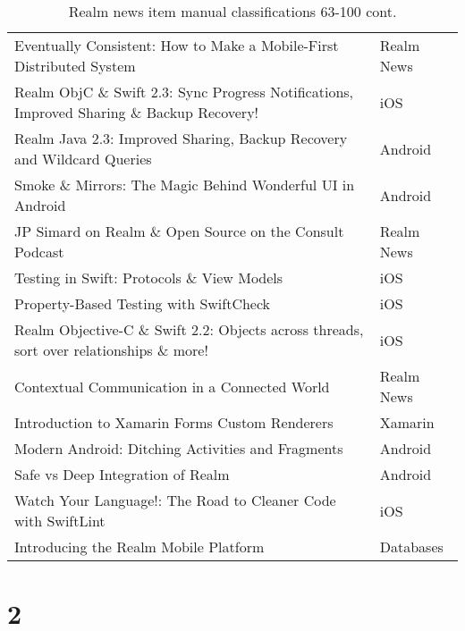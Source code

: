 \documentclass[letterpaper,11pt]{article}
\begin{document}
\begin{table}[h]
\begin{adjustbox}{max width=\linewidth}
\begin{tabular}{ | l | l |}
Eventually Consistent: How to Make a Mobile-First Distributed System & Realm News \\
Realm ObjC \& Swift 2.3: Sync Progress Notifications, Improved Sharing \& Backup Recovery! & iOS \\
Realm Java 2.3: Improved Sharing, Backup Recovery and Wildcard Queries & Android \\
Smoke \& Mirrors: The Magic Behind Wonderful UI in Android & Android \\
JP Simard on Realm \& Open Source on the Consult Podcast & Realm News \\
Testing in Swift: Protocols \& View Models & iOS \\
Property-Based Testing with SwiftCheck & iOS \\
Realm Objective-C \& Swift 2.2: Objects across threads, sort over relationships \& more! & iOS  \\
Contextual Communication in a Connected World & Realm News \\
Introduction to Xamarin Forms Custom Renderers & Xamarin \\
Modern Android: Ditching Activities and Fragments & Android  \\
Safe vs Deep Integration of Realm & Android \\
Watch Your Language!: The Road to Cleaner Code with SwiftLint & iOS \\
Introducing the Realm Mobile Platform & Databases \\
\hline
\end{tabular}
\end{adjustbox}
\caption{Realm news item manual classifications 63-100 cont.}
\label{table:q1mclass}
\end{table}

\clearpage




\clearpage


\section*{2}
\end{document}
